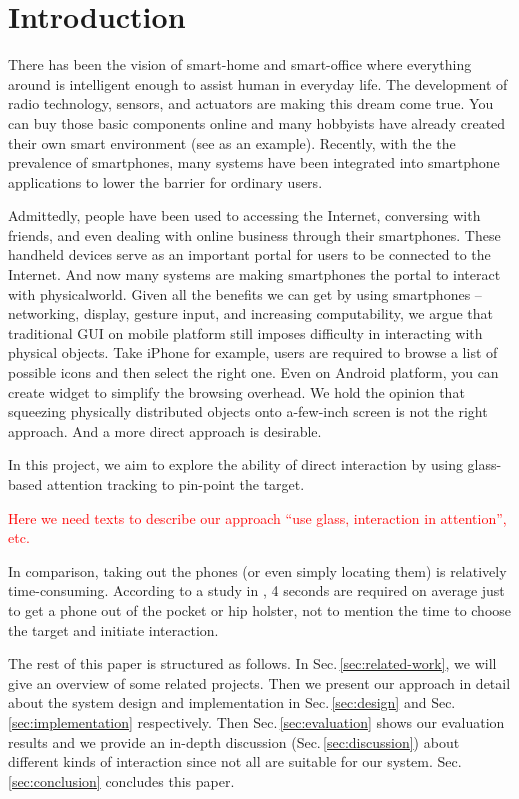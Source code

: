 \section{Introduction}
\label{sec:introduction}

There has been the vision of smart-home and smart-office where everything around is intelligent enough to assist human in everyday life. The development of radio technology, sensors, and actuators are making this dream come true. You can buy those basic components online \cite{SmartHome, NinjaBlocks} and many hobbyists have already created their own smart environment (see \cite{BRAD} as an example). Recently, with the the prevalence of smartphones, many systems \cite{SmartThings, Lockitron} have been integrated into smartphone applications to lower the barrier for ordinary users.

Admittedly, people have been used to accessing the Internet, conversing with friends, and even dealing with online business through their smartphones. These handheld devices serve as an important portal for users to be connected to the Internet. And now many systems are making smartphones the portal to interact with physicalworld. Given all the benefits we can get by using smartphones -- networking,  display, gesture input, and increasing computability,  we argue that traditional GUI on mobile platform still imposes difficulty in interacting with physical objects. Take iPhone for example, users are required to browse a list of possible icons and then select the right one. Even on Android platform, you can create widget to simplify the browsing overhead. We hold the opinion that squeezing physically distributed objects onto a-few-inch screen is not the right approach. And a more direct approach is desirable.

In this project, we aim to explore the ability of direct interaction by using glass-based attention tracking to pin-point the target. 

\textcolor{red}{Here we need texts to describe our approach ``use glass, interaction in attention'', etc.}


In comparison, taking out the phones (or even simply locating them) is relatively time-consuming. According to a study in \cite{Ashbrook:2008:QIM:1357054.1357092}, 4 seconds are required on average just to get a phone out of the pocket or hip holster, not to mention the time to choose the target and initiate interaction. 


The rest of this paper is structured as follows. In Sec.\,\ref{sec:related-work}, we will give an overview of some related projects. Then we present our approach in detail about the system design and implementation in Sec.\,\ref{sec:design} and Sec.\,\ref{sec:implementation} respectively. Then Sec.\,\ref{sec:evaluation} shows our evaluation results and we provide an in-depth discussion (Sec.\,\ref{sec:discussion}) about different kinds of interaction since not all are suitable for our system. Sec.\,\ref{sec:conclusion} concludes this paper.


